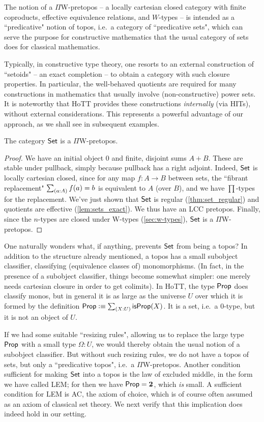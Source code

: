 The notion of a $\Pi$W-pretopos -- a locally cartesian closed category with finite coproducts, effective equivalence relations, and $W$-types -- is intended as a ``predicative" notion of topos, i.e.\ a category of ``predicative sets", which can serve the purpose for constructive mathematics that the usual category of sets does for classical mathematics.  

Typically, in constructive type theory, one resorts to an external construction of ``setoids" -- an exact completion -- to obtain a category with such closure properties.  In particular, the well-behaved quotients are required for many constructions in mathematics that usually involve (non-constructive) power sets.  It is noteworthy that HoTT  provides these constructions \emph{internally} (via HITs), without external considerations.  This represents a powerful advantage of our approach, as we shall see in subsequent examples.

\begin{thm} The category $\mathsf{Set}$ is a $\Pi$W-pretopos.
\end{thm}
\begin{proof}
We have an initial object $0$ and finite, disjoint sums $A+B$.  These are stable under pullback, simply because pullback has a right adjoint.  Indeed, $\mathsf{Set}$ is locally cartesian closed, since for any map $f:A\to B$ between sets, the ``fibrant replacement" $\sm{a:A}f(a)=b$ is equivalent to $A$ (over $B$), and we have $\prod$-types for the replacement.
We've just shown that $\mathsf{Set}$ is regular (\autoref{thm:set_regular}) and quotients are effective (\autoref{lem:sets_exact}). We thus have an LCC pretopos. Finally, since the $n$-types are closed under W-types
(\autoref{sec:w-types}), $\mathsf{Set}$ is a $\Pi$W-pretopos. 
\end{proof}

One naturally wonders what, if anything, prevents $\mathsf{Set}$ from being a topos? In addition to the structure already mentioned, a topos has a small subobject classifier, classifying (equivalence classes of) monomorphisms.  (In fact, in the presence of a subobject classifier, things become somewhat simpler: one merely needs cartesian closure in order to get colimits).  In HoTT, the type $\mathsf{Prop}$ does classify monos, but in general it is as large as the universe $U$ over which it is formed by the definition $\prop \defeq \sm{X:U}\isprop(X)$. It is a set, i.e.\ a $0$-type, but it is not an object of $U$.

If we had some suitable ``resizing rules", allowing us to replace the large type $\mathsf{Prop}$ with a small type $\Omega:U$, we would thereby obtain the usual notion of a subobject classifier. But without such resizing rules, we do not have a topos of sets, but only a ``predicative topos", i.e.\ a $\Pi$W-pretopos.  Another condition sufficient for making $\mathsf{Set}$ into a topos is the law of excluded middle, in the form we have called LEM; for then we have $\mathsf{Prop} = \mathbf{2}$, which \emph{is} small.
A sufficient condition for LEM is AC, the axiom of choice, which is of course often assumed as an axiom of classical set theory. We next verify that this implication does indeed hold in our setting.




